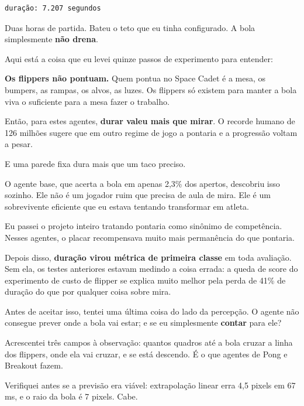 \documentclass[10pt,a4paper,twoside,twocolumn]{scrartcl}
\begin{document}
\begin{verbatim}
duração: 7.207 segundos
\end{verbatim}

Duas horas de partida. Bateu o teto que eu tinha configurado. A bola
simplesmente \textbf{não drena}.

Aqui está a coisa que eu levei quinze passos de experimento para
entender:

\textbf{Os flippers não pontuam.} Quem pontua no Space Cadet é a mesa,
os bumpers, as rampas, os alvos, as luzes. Os flippers só existem para
manter a bola viva o suficiente para a mesa fazer o trabalho.

Então, para estes agentes, \textbf{durar valeu mais que mirar}. O
recorde humano de 126 milhões sugere que em outro regime de jogo a
pontaria e a progressão voltam a pesar.

E uma parede fixa dura mais que um taco preciso.

O agente base, que acerta a bola em apenas 2,3\% dos apertos, descobriu
isso sozinho. Ele não é um jogador ruim que precisa de aula de mira. Ele
é um sobrevivente eficiente que eu estava tentando transformar em
atleta.

Eu passei o projeto inteiro tratando pontaria como sinônimo de
competência. Nesses agentes, o placar recompensava muito mais
permanência do que pontaria.

Depois disso, \textbf{duração virou métrica de primeira classe} em toda
avaliação. Sem ela, os testes anteriores estavam medindo a coisa errada:
a queda de score do experimento de custo de flipper se explica muito
melhor pela perda de 41\% de duração do que por qualquer coisa sobre
mira.

Antes de aceitar isso, tentei uma última coisa do lado da percepção. O
agente não consegue prever onde a bola vai estar; e se eu simplesmente
\textbf{contar} para ele?

Acrescentei três campos à observação: quantos quadros até a bola cruzar
a linha dos flippers, onde ela vai cruzar, e se está descendo. É o que
agentes de Pong e Breakout fazem.

Verifiquei antes se a previsão era viável: extrapolação linear erra 4,5
pixels em 67 ms, e o raio da bola é 7 pixels. Cabe.

\vspace{0.2em}
\begin{center}\small
{}
\end{center}
\vspace{0.1em}
\end{document}
